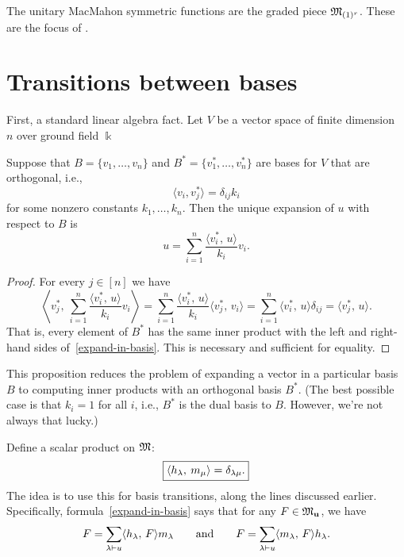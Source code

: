 The unitary MacMahon symmetric functions are the graded piece $\mathfrak{M}_{(1)^r}$.  These are the focus of \cite{Doubilet}.
 
\section{Transitions between bases}

First, a standard linear algebra fact.
Let $V$ be a vector space of finite dimension~$n$ over ground field $\Bbbk$

\begin{proposition} \label{expansion}
Suppose that $B=\{v_1,\dots,v_n\}$ and $B^*=\{v_1^*,\dots,v_n^*\}$ are bases for $V$ that are orthogonal, i.e.,
\[\langle v_i,v^*_j\rangle=\delta_{ij} k_i\]
for some nonzero constants $k_1,\dots,k_n$.  Then the unique expansion of $u$ with respect to $B$ is
\begin{equation} \label{expand-in-basis}
u = \sum_{i=1}^n \frac{\langle v_i^*,\,u\rangle}{k_i} v_i.
\end{equation}
\end{proposition}

\begin{proof}
For every $j\in[n]$ we have
\[
\left\langle v_j^*,\ \sum_{i=1}^n \frac{\langle v_i^*,\,u\rangle}{k_i} v_i\right\rangle
= \sum_{i=1}^n \frac{\langle v_i^*,\,u\rangle}{k_i} \langle v_j^*,\,v_i\rangle
= \sum_{i=1}^n \langle v_i^*,\,u\rangle \delta_{ij}
= \langle v_j^*,\,u\rangle.\]
That is, every element of $B^*$ has the same inner product with the left and right-hand sides of~\eqref{expand-in-basis}.
This is necessary and sufficient for equality.
\end{proof}

This proposition reduces the problem of expanding a vector in a particular basis $B$ to computing inner products with an orthogonal basis $B^*$.
(The best possible case is that $k_i=1$ for all $i$, i.e., $B^*$ is the dual basis to $B$.  However, we're not always that lucky.)


Define a scalar product on $\mathfrak{M}$:
\begin{equation}\label{scalar-product}
\boxed{\left\langle h_\lambda,\:m_\mu\right\rangle=\delta_{\lambda\mu}.}
\end{equation}
The idea is to use this for basis transitions, along the lines discussed earlier.  Specifically, formula~\eqref{expand-in-basis} says that for any $F\in\mathfrak{M}_{\mathbf{u}}$, we have
\begin{equation} \label{expand-Mac}
F=\sum_{\lambda\vdash u} \langle h_\lambda,\,F\rangle m_\lambda \qquad\text{and}\qquad
F=\sum_{\lambda\vdash u} \langle m_\lambda,\,F\rangle h_\lambda.
\end{equation}

